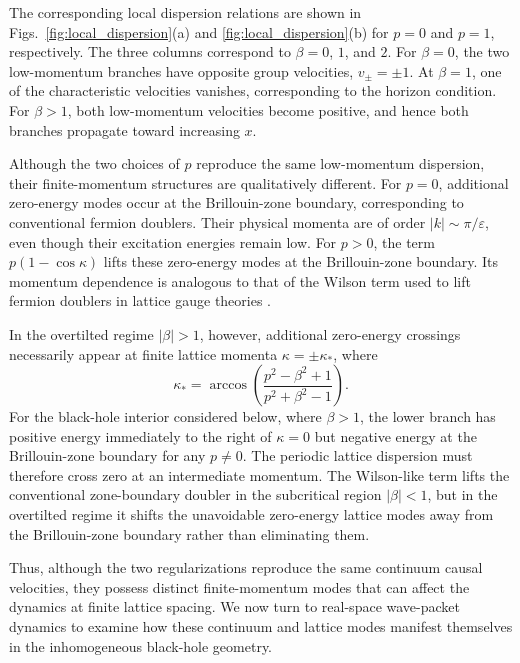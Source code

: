 \documentclass[reprint,amsmath,amssymb,aps,showkeys,superscriptaddress]{revtex4-2}
\begin{document}
The corresponding local dispersion relations are shown in
Figs.~\ref{fig:local_dispersion}(a) and
\ref{fig:local_dispersion}(b) for $p=0$ and $p=1$, respectively.
The three columns correspond to $\beta=0$, $1$, and $2$.
For $\beta=0$, the two low-momentum branches have opposite group
velocities, $v_{\pm}=\pm1$. At $\beta=1$, one of the
characteristic velocities vanishes, corresponding to the horizon
condition. For $\beta>1$, both low-momentum velocities become
positive, and hence both branches propagate toward increasing $x$.

Although the two choices of $p$ reproduce the same low-momentum
dispersion, their finite-momentum structures are qualitatively
different. For $p=0$, additional zero-energy modes occur at the
Brillouin-zone boundary, corresponding to conventional fermion
doublers. Their physical momenta are of order
$|k|\sim\pi/\varepsilon$, even though their excitation energies
remain low. For $p>0$, the term $p(1-\cos\kappa)$ lifts these
zero-energy modes at the Brillouin-zone boundary. Its momentum
dependence is analogous to that of the Wilson term used to lift
fermion doublers in lattice gauge theories \cite{Wilson1974}.

In the overtilted regime $|\beta|>1$, however, additional
zero-energy crossings necessarily appear at finite lattice momenta
$\kappa=\pm\kappa_\ast$, where
\begin{equation}
  \kappa_\ast
  =
  \arccos\left(
    \frac{p^2-\beta^2+1}
         {p^2+\beta^2-1}
  \right).
  \label{eq:finite_momentum_crossing}
\end{equation}
For the black-hole interior considered below, where $\beta>1$, the
lower branch has positive energy immediately to the right of
$\kappa=0$ but negative energy at the Brillouin-zone boundary for
any $p\neq0$. The periodic lattice dispersion must therefore cross
zero at an intermediate momentum. The Wilson-like term lifts the
conventional zone-boundary doubler in the subcritical region
$|\beta|<1$, but in the overtilted regime it shifts the unavoidable
zero-energy lattice modes away from the Brillouin-zone boundary
rather than eliminating them.

Thus, although the two regularizations reproduce the same continuum
causal velocities, they possess distinct finite-momentum modes that
can affect the dynamics at finite lattice spacing. We now turn to
real-space wave-packet dynamics to examine how these continuum and
lattice modes manifest themselves in the inhomogeneous black-hole
geometry.
\end{document}
